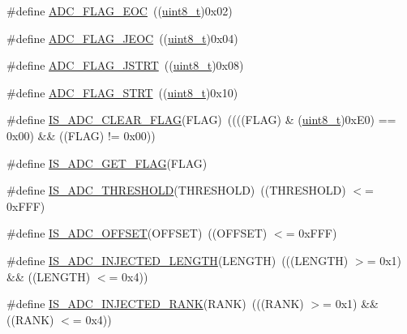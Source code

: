 \begin{DoxyCompactItemize}
\item 
\#define \hyperlink{group___a_d_c__flags__definition_gaf2c6fdf7e9ab63b778149e5fb56413d4}{A\+D\+C\+\_\+\+F\+L\+A\+G\+\_\+\+E\+OC}~((\hyperlink{_p_e___types_8h_aba7bc1797add20fe3efdf37ced1182c5}{uint8\+\_\+t})0x02)
\item 
\#define \hyperlink{group___a_d_c__flags__definition_ga4df8eea8ab83d98104ee15a339743a4e}{A\+D\+C\+\_\+\+F\+L\+A\+G\+\_\+\+J\+E\+OC}~((\hyperlink{_p_e___types_8h_aba7bc1797add20fe3efdf37ced1182c5}{uint8\+\_\+t})0x04)
\item 
\#define \hyperlink{group___a_d_c__flags__definition_ga278f4e866f4322c1120bf0db5301c432}{A\+D\+C\+\_\+\+F\+L\+A\+G\+\_\+\+J\+S\+T\+RT}~((\hyperlink{_p_e___types_8h_aba7bc1797add20fe3efdf37ced1182c5}{uint8\+\_\+t})0x08)
\item 
\#define \hyperlink{group___a_d_c__flags__definition_gad0c59ae7749c69b5b91f2c533db1b619}{A\+D\+C\+\_\+\+F\+L\+A\+G\+\_\+\+S\+T\+RT}~((\hyperlink{_p_e___types_8h_aba7bc1797add20fe3efdf37ced1182c5}{uint8\+\_\+t})0x10)
\item 
\#define \hyperlink{group___a_d_c__flags__definition_gac5b6fb60ec921255b05261ec04573470}{I\+S\+\_\+\+A\+D\+C\+\_\+\+C\+L\+E\+A\+R\+\_\+\+F\+L\+AG}(F\+L\+AG)~((((F\+L\+AG) \& (\hyperlink{_p_e___types_8h_aba7bc1797add20fe3efdf37ced1182c5}{uint8\+\_\+t})0x\+E0) == 0x00) \&\& ((\+F\+L\+A\+G) != 0x00))
\item 
\#define \hyperlink{group___a_d_c__flags__definition_ga597eb68dfef9dbe0928ed14a1aedc710}{I\+S\+\_\+\+A\+D\+C\+\_\+\+G\+E\+T\+\_\+\+F\+L\+AG}(F\+L\+AG)
\item 
\#define \hyperlink{group___a_d_c__thresholds_gaa71cdff6dafddfccff8a7e88768bfb54}{I\+S\+\_\+\+A\+D\+C\+\_\+\+T\+H\+R\+E\+S\+H\+O\+LD}(T\+H\+R\+E\+S\+H\+O\+LD)~((T\+H\+R\+E\+S\+H\+O\+LD) $<$= 0x\+F\+F\+F)
\item 
\#define \hyperlink{group___a_d_c__injected__offset_ga252eaf5d2552f0d11b1bcca7dc48950a}{I\+S\+\_\+\+A\+D\+C\+\_\+\+O\+F\+F\+S\+ET}(O\+F\+F\+S\+ET)~((O\+F\+F\+S\+ET) $<$= 0x\+F\+F\+F)
\item 
\#define \hyperlink{group___a_d_c__injected__length_gaecdddab7424a697722683296ca70e176}{I\+S\+\_\+\+A\+D\+C\+\_\+\+I\+N\+J\+E\+C\+T\+E\+D\+\_\+\+L\+E\+N\+G\+TH}(L\+E\+N\+G\+TH)~(((L\+E\+N\+G\+TH) $>$= 0x1) \&\& ((\+L\+E\+N\+G\+T\+H) $<$= 0x4))
\item 
\#define \hyperlink{group___a_d_c__injected__rank_ga63f95f9a45f4d718aabc9e429d860e9d}{I\+S\+\_\+\+A\+D\+C\+\_\+\+I\+N\+J\+E\+C\+T\+E\+D\+\_\+\+R\+A\+NK}(R\+A\+NK)~(((R\+A\+NK) $>$= 0x1) \&\& ((\+R\+A\+N\+K) $<$= 0x4))

\end{DoxyCompactItemize}
